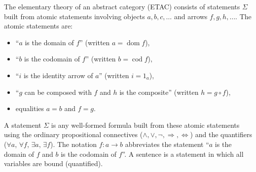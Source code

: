 The elementary theory of an abstract category (ETAC) consists of statements $\Sigma$ built from atomic statements involving objects $a, b, c, \ldots$ and arrows $f, g, h, \ldots$. The atomic statements are:
\begin{itemize}
  \item ``$a$ is the domain of $f$'' (written $a = \operatorname{dom} f$),
  \item ``$b$ is the codomain of $f$'' (written $b = \operatorname{cod} f$),
  \item ``$i$ is the identity arrow of $a$'' (written $i = 1_a$),
  \item ``$g$ can be composed with $f$ and $h$ is the composite'' (written $h = g \circ f$),
  \item equalities $a = b$ and $f = g$.
\end{itemize}
A statement $\Sigma$ is any well-formed formula built from these atomic statements using the ordinary propositional connectives ($\land, \lor, \lnot, \Rightarrow, \Leftrightarrow$) and the quantifiers ($\forall a$, $\forall f$, $\exists a$, $\exists f$). The notation $f: a \to b$ abbreviates the statement ``$a$ is the domain of $f$ and $b$ is the codomain of $f$''. A sentence is a statement in which all variables are bound (quantified).

